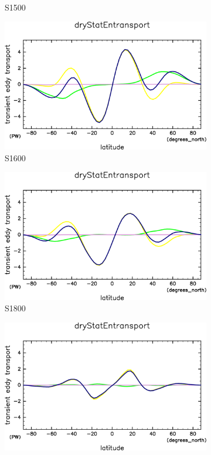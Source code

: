 \documentclass[body]{subfiles}
\begin{document}
\begin{figure}[t]
\begin{subfigure}{.4\textwidth}
		\caption{S1500}\label{乾燥静的エネルギーS1500}
	\end{subfigure}
	\begin{subfigure}{.4\textwidth}
		\centering
		\includegraphics[width=\textwidth]{S1600/MeriHeatTrans@dryStatEn,time=3650:4015-crop-rotate.pdf}
		\caption{S1600}\label{乾燥静的エネルギーS1600}
	\end{subfigure}
	\begin{subfigure}{.4\textwidth}
		\centering
		\includegraphics[width=\textwidth]{S1800/MeriHeatTrans@dryStatEn,time=3650:4015-crop-rotate.pdf}
		\caption{S1800}\label{乾燥静的エネルギーS1800}
	\end{subfigure}
	\begin{subfigure}{.4\textwidth}
		\centering
		\includegraphics[width=\textwidth]{S2000/MeriHeatTrans@dryStatEn,time=7300:7665-crop-rotate.pdf}

\end{subfigure}
\end{figure}
\end{document}
